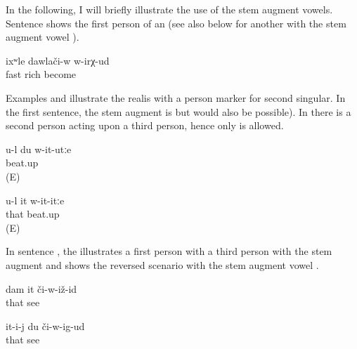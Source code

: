 In the following, I will briefly illustrate the use of the stem augment vowels. Sentence  shows the  first person of an  (see also  below for another  with the stem augment vowel ).
%
\begin{exe}
	\ex	\label{ex:‎‎‎I become rich fast}
	\gll	ixʷle	dawlači-w	w-irχ-ud\\
		fast	rich	become\\
	\glt	{}
\end{exe}

Examples  and  illustrate the realis  with a person marker for second singular. In the first sentence, the stem augment is  but  would also be possible). In  there is a second person  acting upon a third person, hence only  is allowed. 
%
\begin{exe}
	\ex	\label{ex:if you beat me up}
	\gll	u-l	du	w-it-utːe\\
				beat.up\\
	\glt	{} (E)

	\ex	\label{ex:if you beat him up}
	\gll	u-l	it	w-it-itːe\\
			that	beat.up\\
	\glt	{} (E)
\end{exe}

In sentence , the  illustrates a first person  with a third person  with the stem augment  and  shows the reversed scenario with the stem augment vowel .
%
\begin{exe}
	\ex	\label{ex:habitual present stem augmentation@20}
	\begin{xlist}
		\ex	\label{ex:I will see him@20a}
		\gll	dam	it 	či-w-iž-id\\
				that	see\\
		\glt	{}

		\ex	\label{ex:S/he will see me@20c}
		\gll	it-i-j	du	či-w-ig-ud\\
			that		see\\
		\glt	{}
	\end{xlist}
\end{exe}

